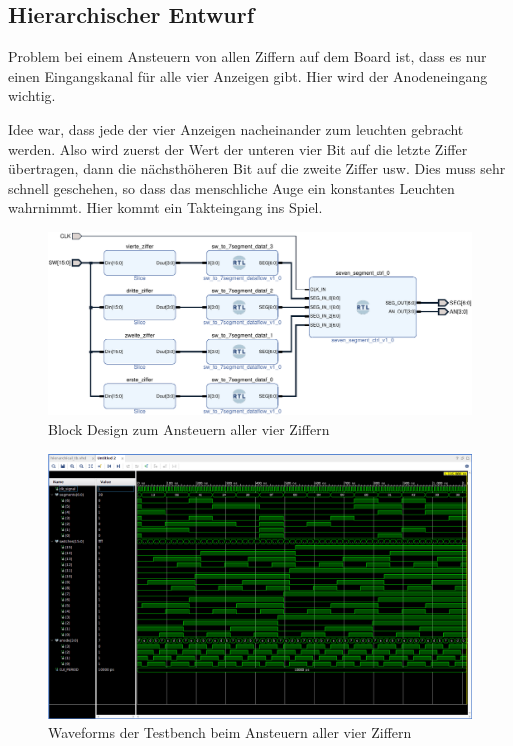 \documentclass[11pt, a4paper]{article}
\begin{document}
\subsection*{Hierarchischer Entwurf}
Problem bei einem Ansteuern von allen Ziffern auf dem Board ist, dass es nur einen Eingangskanal für alle vier Anzeigen gibt. Hier wird der Anodeneingang wichtig.

Idee war, dass jede der vier Anzeigen nacheinander zum leuchten gebracht werden.
Also wird zuerst der Wert der unteren vier Bit auf die letzte Ziffer übertragen, dann die nächsthöheren Bit auf die zweite Ziffer usw. Dies muss sehr schnell geschehen, so dass das menschliche Auge ein konstantes Leuchten wahrnimmt. Hier kommt ein Takteingang ins Spiel.

\begin{figure}[htb]    
    \centering
    \includegraphics[width=\linewidth]{versuch3Data/hierarchical_display.pdf}
    \caption{Block Design zum Ansteuern aller vier Ziffern}
    \label{aufbauHierarchie}        
\end{figure}
\begin{figure}[htb]    
    \centering
    \includegraphics[width=\linewidth]{versuch3Data/hierarchical.png}
    \caption{Waveforms der Testbench beim Ansteuern aller vier Ziffern}
    \label{waveformHierarchie}        
\end{figure}
\end{document}
